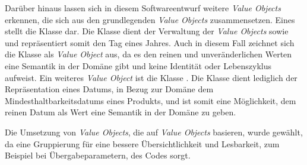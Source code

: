 Darüber hinaus lassen sich in diesem Softwareentwurf weitere \textit{Value Objects} erkennen, die sich aus den grundlegenden \textit{Value Objects} zusammensetzen.
Eines stellt die Klasse \href{}{} dar.
Die Klasse dient der Verwaltung der \textit{Value Objects} \href{}{} sowie \href{}{} und repräsentiert somit den Tag eines Jahres.
Auch in diesem Fall zeichnet sich die Klasse \href{}{} als \textit{Value Object} aus, da es den reinen und unveränderlichen Werten eine Semantik in der Domäne gibt und keine Identität oder Lebenszyklus aufweist.
Ein weiteres \textit{Value Object} ist die Klasse \href{}{}.
Die Klasse dient lediglich der Repräsentation eines Datums, in Bezug zur Domäne dem Mindesthaltbarkeitsdatums eines Produkts, und ist somit eine Möglichkeit, dem reinen Datum als Wert eine Semantik in der Domäne zu geben.

Die Umsetzung von \textit{Value Objects}, die auf \textit{Value Objects} basieren, wurde gewählt, da eine Gruppierung für eine bessere Übersichtlichkeit und Lesbarkeit, zum Beispiel bei Übergabeparametern, des Codes sorgt.


